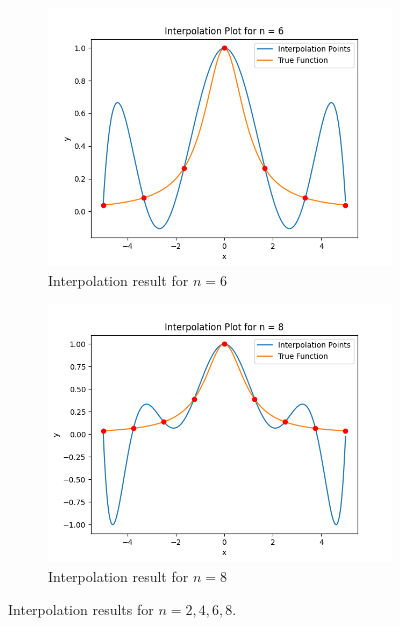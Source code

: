 \documentclass[a4paper]{article}
\begin{document}
\begin{figure}[htbp]
    \begin{subfigure}[b]{0.48\textwidth}
        \includegraphics[width=\textwidth]{../results/Task_B/Interpolation_Plot_n_6.png}
        \caption{Interpolation result for $n = 6$}
    \end{subfigure}
    \hfill
    \begin{subfigure}[b]{0.48\textwidth}
        \includegraphics[width=\textwidth]{../results/Task_B/Interpolation_Plot_n_8.png}
        \caption{Interpolation result for $n = 8$}
    \end{subfigure}
    \caption{Interpolation results for $n = 2, 4, 6, 8.$}
    \label{fig:B.results}
\end{figure}
\end{document}
